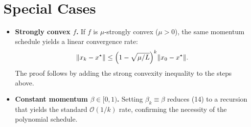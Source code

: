 \documentclass{article}
\begin{document}
\section*{Special Cases}
\begin{itemize}
\item \textbf{Strongly convex $f$.} If $f$ is $\mu$‑strongly convex ($\mu>0$), the same momentum schedule yields a linear convergence rate:
\[
\|x_{k}-x^{\star}\|\le\Bigl(1-\sqrt{\mu/L}\Bigr)^{k}\|x_{0}-x^{\star}\|.
\]
The proof follows by adding the strong convexity inequality to the steps above.
\item \textbf{Constant momentum $\beta\in[0,1)$.} Setting $\beta_{k}\equiv\beta$ reduces (14) to a recursion that yields the standard $\mathcal{O}(1/k)$ rate, confirming the necessity of the polynomial schedule.
\end{itemize}
\end{document}

